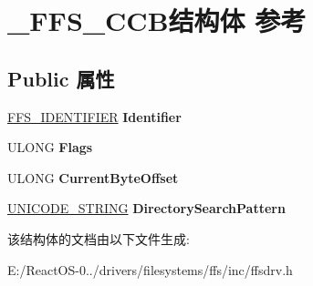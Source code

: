 \hypertarget{struct___f_f_s___c_c_b}{}\section{\+\_\+\+F\+F\+S\+\_\+\+C\+C\+B结构体 参考}
\label{struct___f_f_s___c_c_b}
\subsection*{Public 属性}
\begin{DoxyCompactItemize}
\item 
\mbox{\label{struct___f_f_s___c_c_b_a06fd22430a36ba05ff47b711eee82e7c}} 
\hyperlink{struct___f_f_s___i_d_e_n_t_i_f_i_e_r}{F\+F\+S\+\_\+\+I\+D\+E\+N\+T\+I\+F\+I\+ER} {\bfseries Identifier}
\item 
\mbox{\label{struct___f_f_s___c_c_b_ab75d5c78a50273dee9cf4b31d41d76c3}} 
U\+L\+O\+NG {\bfseries Flags}
\item 
\mbox{\label{struct___f_f_s___c_c_b_acac3c0c3bcf0961a5752f20a8a020624}} 
U\+L\+O\+NG {\bfseries Current\+Byte\+Offset}
\item 
\mbox{\label{struct___f_f_s___c_c_b_aedaa00d9c5f115cb6d6016f23f507823}} 
\hyperlink{struct___u_n_i_c_o_d_e___s_t_r_i_n_g}{U\+N\+I\+C\+O\+D\+E\+\_\+\+S\+T\+R\+I\+NG} {\bfseries Directory\+Search\+Pattern}
\end{DoxyCompactItemize}


该结构体的文档由以下文件生成\+:\begin{DoxyCompactItemize}
\item 
E\+:/\+React\+O\+S-\/0../drivers/filesystems/ffs/inc/ffsdrv.\+h\end{DoxyCompactItemize}
